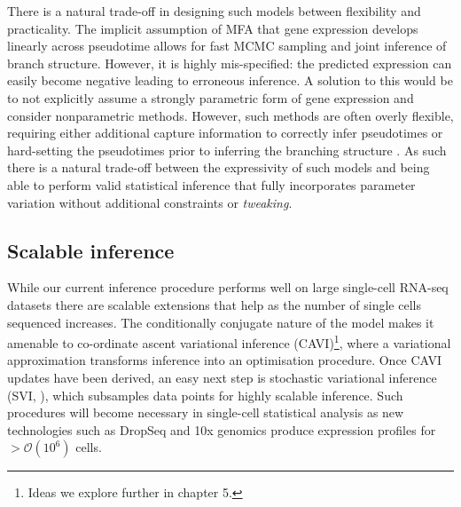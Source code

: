 There is a natural trade-off in designing such models between flexibility and practicality. The implicit assumption of MFA that gene expression develops linearly across pseudotime allows for fast MCMC sampling and joint inference of branch structure. However, it is highly mis-specified: the predicted expression can easily become negative leading to erroneous inference. A solution to this would be to not explicitly assume a strongly parametric form of gene expression and consider nonparametric methods. However, such methods are often overly flexible, requiring either additional capture information to correctly infer pseudotimes \cite{Reid2016-yo} or hard-setting the pseudotimes prior to inferring the branching structure \cite{lonnberg2016temporal}. As such there is a natural trade-off between the expressivity of such models and being able to perform valid statistical inference that fully incorporates parameter variation without additional constraints or
 \emph{tweaking}.




\subsection{Scalable inference}

While our current inference procedure performs well on large single-cell RNA-seq datasets there are scalable extensions that help as the number of single cells sequenced increases. The conditionally conjugate nature of the model makes it amenable to co-ordinate ascent variational inference (CAVI)\footnote{Ideas we explore further in chapter 5.}, where a variational approximation transforms inference into an optimisation procedure. Once CAVI updates have been derived, an easy next step is   stochastic variational inference (SVI, \cite{hoffman2013stochastic}), which subsamples data points for highly scalable inference. Such procedures will become necessary in single-cell statistical analysis as new technologies such as DropSeq \cite{Macosko2015-ek}
and 10x genomics \cite{eisenstein2015startups} produce expression profiles for $>\mathcal{O}(10^6)$ cells.

